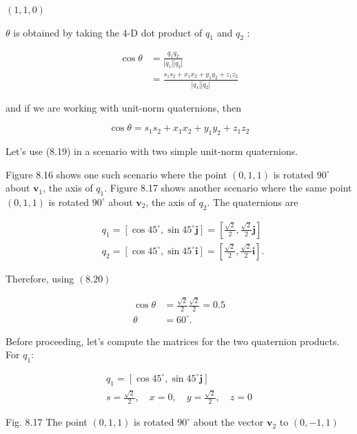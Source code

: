 \documentclass[10pt]{article}
\begin{document}
$(1,1,0)$

$\theta$ is obtained by taking the 4-D dot product of $q_{1}$ and $q_{2}$ :

$$
\begin{aligned}
\cos \theta & =\frac{q_{1} q_{2}}{\left|q_{1}\right|\left|q_{2}\right|} \\
& =\frac{s_{1} s_{2}+x_{1} x_{2}+y_{1} y_{2}+z_{1} z_{2}}{\left|q_{1}\right|\left|q_{2}\right|}
\end{aligned}
$$

and if we are working with unit-norm quaternions, then

$$
\cos \theta=s_{1} s_{2}+x_{1} x_{2}+y_{1} y_{2}+z_{1} z_{2}
$$

Let's use (8.19) in a scenario with two simple unit-norm quaternions.

Figure 8.16 shows one such scenario where the point $(0,1,1)$ is rotated $90^{\circ}$ about $\mathbf{v}_{1}$, the axis of $q_{1}$. Figure 8.17 shows another scenario where the same point $(0,1,1)$ is rotated $90^{\circ}$ about $\mathbf{v}_{2}$, the axis of $q_{2}$. The quaternions are

$$
\begin{aligned}
& q_{1}=\left[\cos 45^{\circ}, \sin 45^{\circ} \mathbf{j}\right]=\left[\frac{\sqrt{2}}{2}, \frac{\sqrt{2}}{2} \mathbf{j}\right] \\
& q_{2}=\left[\cos 45^{\circ}, \sin 45^{\circ} \mathbf{i}\right]=\left[\frac{\sqrt{2}}{2}, \frac{\sqrt{2}}{2} \mathbf{i}\right] .
\end{aligned}
$$

Therefore, using $(8.20)$

$$
\begin{aligned}
\cos \theta & =\frac{\sqrt{2}}{2} \frac{\sqrt{2}}{2}=0.5 \\
\theta & =60^{\circ} .
\end{aligned}
$$

Before proceeding, let's compute the matrices for the two quaternion products. For $q_{1}:$

$$
\begin{gathered}
q_{1}=\left[\cos 45^{\circ}, \sin 45^{\circ} \mathbf{j}\right] \\
s=\frac{\sqrt{2}}{2}, \quad x=0, \quad y=\frac{\sqrt{2}}{2}, \quad z=0
\end{gathered}
$$

Fig. 8.17 The point $(0,1,1)$ is rotated $90^{\circ}$ about the vector $\mathbf{v}_{2}$ to $(0,-1,1)$
\end{document}
